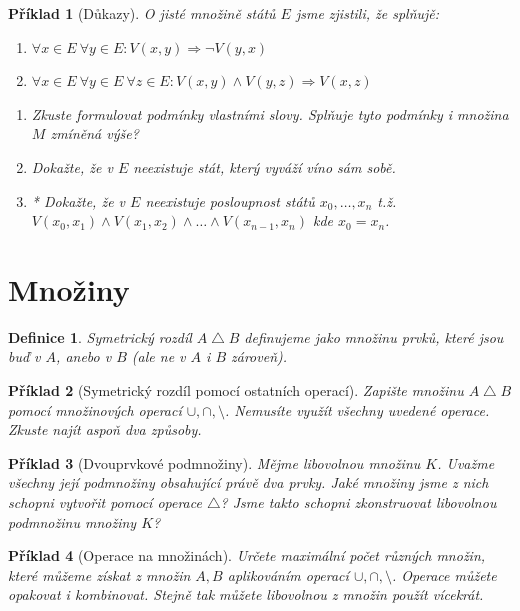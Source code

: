 \documentclass[10pt]{article}
\theoremstyle{definitionstyle}
\newtheorem{defn}{Definice}
\theoremstyle{problemstyle}
\newtheorem{problem}{Příklad}
\begin{document}
\begin{problem}[Důkazy]
O jisté množině států $E$ jsme zjistili, že splňujě:
\begin{enumerate}
    \item $\forall x \in E \ \forall y \in E: V(x,y) \Rightarrow \neg V(y,x)$
    \item $\forall x \in E \ \forall y \in E \  \forall z \in E : V(x,y) \wedge V(y,z) \Rightarrow V(x,z)$
\end{enumerate} 
\begin{enumerate}[label=(\alph*)]
    \item Zkuste formulovat podmínky vlastními slovy. Splňuje tyto podmínky i množina $M$ zmíněná výše?
    \item Dokažte, že v $E$ neexistuje stát, který vyváží víno sám sobě.
    \item* Dokažte, že v $E$ neexistuje posloupnost států $x_0, \ldots , x_n$ t.ž. $V(x_0,x_1) \wedge V(x_1,x_2) \wedge \ldots \wedge  V(x_{n-1},x_n)$ kde $x_0 = x_n$.

\end{enumerate}

\end{problem}

\section{Množiny}

\begin{defn}
    Symetrický rozdíl $A \bigtriangleup B$ definujeme jako množinu prvků, které jsou buď v $A$, anebo v $B$ (ale ne v $A$ i $B$ zároveň).
\end{defn}

\begin{problem}[Symetrický rozdíl pomocí ostatních operací]
Zapište množinu $A \bigtriangleup B$ pomocí množinových operací $\cup, \cap, \setminus$. Nemusíte využít všechny uvedené operace. Zkuste najít aspoň dva způsoby.
\end{problem}

\begin{problem}[Dvouprvkové podmnožiny]
Mějme libovolnou množinu $K$. Uvažme všechny její podmnožiny obsahující právě dva prvky. Jaké množiny jsme z nich schopni vytvořit pomocí operace $\bigtriangleup$? Jsme takto schopni zkonstruovat libovolnou podmnožinu množiny $K$?
\end{problem}

\begin{problem}[Operace na množinách]
Určete maximální počet různých množin, které můžeme získat z množin $A,B$ aplikováním operací $\cup, \cap, \setminus$. Operace můžete opakovat i kombinovat. Stejně tak můžete libovolnou z množin použít vícekrát.
\end{problem}
\end{document}
